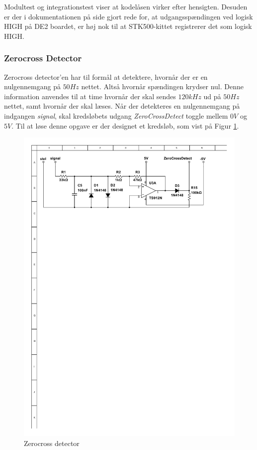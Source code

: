 Modultest og integrationstest viser at kodelåsen virker efter hensigten. Desuden er der i dokumentationen på side \pageref{P-sec:Kodelaas} gjort rede for, at udgangsspændingen ved logisk HIGH på DE2 boardet, er høj nok til at STK500-kittet registrerer det som logisk HIGH.

\subsubsection{Zerocross Detector}
Zerocross detector'en har til formål at detektere, hvornår der er en nulgennemgang på $50Hz$ nettet. Altså hvornår spændingen krydser nul. Denne information anvendes til at time hvornår der skal sendes $120kHz$ ud på $50Hz$ nettet, samt hvornår der skal læses. Når der detekteres en nulgennemgang på indgangen \textit{signal}, skal kredsløbets udgang \textit{ZeroCrossDetect} toggle mellem $0V$ og $5V$. Til at løse denne opgave er der designet et kredsløb, som vist på Figur \ref{fig:ZeroCrossDetect}.

\begin{figure}[h]
	\centering
	\includegraphics[scale=1, trim=45 635 80 50, clip=true]{../Projektdokumentation/HardwareDesign/Diagrammer/ZeroCrossDetector.pdf}
	\caption{Zerocross detector}
	\label{fig:ZeroCrossDetect}
\end{figure}

